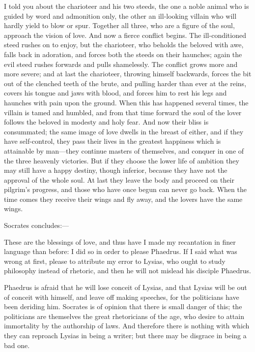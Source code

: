 \documentclass[11pt,letter]{article}
\begin{document}
\par  I told you about the charioteer and his two steeds, the one a noble animal who is guided by word and admonition only, the other an ill-looking villain who will hardly yield to blow or spur. Together all three, who are a figure of the soul, approach the vision of love. And now a fierce conflict begins. The ill-conditioned steed rushes on to enjoy, but the charioteer, who beholds the beloved with awe, falls back in adoration, and forces both the steeds on their haunches; again the evil steed rushes forwards and pulls shamelessly. The conflict grows more and more severe; and at last the charioteer, throwing himself backwards, forces the bit out of the clenched teeth of the brute, and pulling harder than ever at the reins, covers his tongue and jaws with blood, and forces him to rest his legs and haunches with pain upon the ground. When this has happened several times, the villain is tamed and humbled, and from that time forward the soul of the lover follows the beloved in modesty and holy fear. And now their bliss is consummated; the same image of love dwells in the breast of either, and if they have self-control, they pass their lives in the greatest happiness which is attainable by man—they continue masters of themselves, and conquer in one of the three heavenly victories. But if they choose the lower life of ambition they may still have a happy destiny, though inferior, because they have not the approval of the whole soul. At last they leave the body and proceed on their pilgrim's progress, and those who have once begun can never go back. When the time comes they receive their wings and fly away, and the lovers have the same wings.

\par  Socrates concludes:—

\par  These are the blessings of love, and thus have I made my recantation in finer language than before: I did so in order to please Phaedrus. If I said what was wrong at first, please to attribute my error to Lysias, who ought to study philosophy instead of rhetoric, and then he will not mislead his disciple Phaedrus.

\par  Phaedrus is afraid that he will lose conceit of Lysias, and that Lysias will be out of conceit with himself, and leave off making speeches, for the politicians have been deriding him. Socrates is of opinion that there is small danger of this; the politicians are themselves the great rhetoricians of the age, who desire to attain immortality by the authorship of laws. And therefore there is nothing with which they can reproach Lysias in being a writer; but there may be disgrace in being a bad one.
\end{document}
